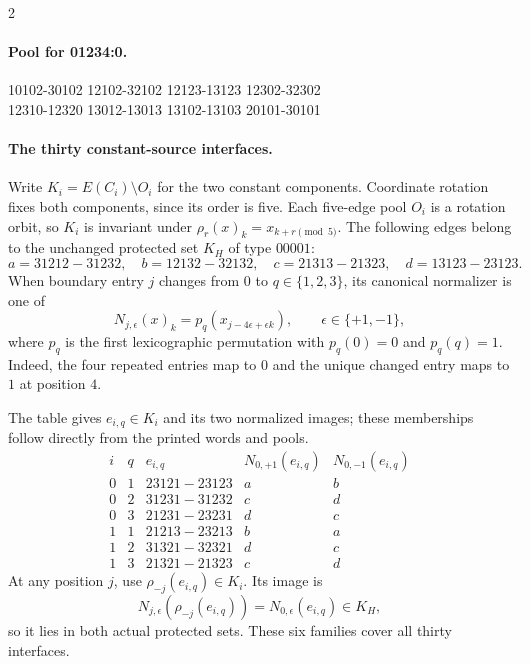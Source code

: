 \documentclass[11pt]{article}
\numberwithin{equation}{section}
\numberwithin{table}{section}
\begin{document}
\begin{multicols}{2}
\paragraph{Pool for 01234:0.}
\begingroup\footnotesize\ttfamily\begin{flushleft}
10102-30102 12102-32102 12123-13123 12302-32302\\
12310-12320 13012-13013 13102-13103 20101-30101\\
\end{flushleft}\endgroup
\end{multicols}
\endgroup
\paragraph{The thirty constant-source interfaces.}
Write $K_i=E(C_i)\setminus O_i$ for the two constant components.
Coordinate rotation fixes both components, since its order is five.
Each five-edge pool $O_i$ is a rotation orbit, so $K_i$ is invariant
under $\rho_r(x)_k=x_{k+r\pmod5}$. The following edges belong to
the unchanged protected set $K_H$ of type $00001$:
\[
a=31212\!-31232,\quad b=12132\!-32132,\quad
c=21313\!-21323,\quad d=13123\!-23123.
\]
When boundary entry $j$ changes from $0$ to $q\in\{1,2,3\}$,
its canonical normalizer is one of
\[
 N_{j,\epsilon}(x)_k=p_q(x_{j-4\epsilon+\epsilon k}),
 \qquad \epsilon\in\{+1,-1\},
\]
where $p_q$ is the first lexicographic permutation with $p_q(0)=0$
and $p_q(q)=1$. Indeed, the four repeated entries map to $0$ and
the unique changed entry maps to $1$ at position $4$.
\par{}
The table gives $e_{i,q}\in K_i$ and its two normalized images;
these memberships follow directly from the printed words and pools.
\[
\begin{array}{cc|c|cc}
i&q&e_{i,q}&N_{0,+1}(e_{i,q})&N_{0,-1}(e_{i,q})\\ \hline
0&1&23121\!-23123&a&b\\
0&2&31231\!-31232&c&d\\
0&3&21231\!-23231&d&c\\
1&1&21213\!-23213&b&a\\
1&2&31321\!-32321&d&c\\
1&3&21321\!-21323&c&d
\end{array}
\]
At any position $j$, use $\rho_{-j}(e_{i,q})\in K_i$. Its image is
\[
 N_{j,\epsilon}(\rho_{-j}(e_{i,q}))
      =N_{0,\epsilon}(e_{i,q})\in K_H,
\]
so it lies in both actual protected sets. These six families cover
all thirty interfaces.
\end{document}
